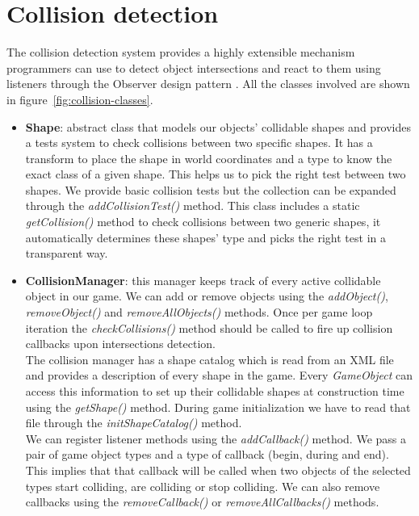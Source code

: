 \section{Collision detection}

The collision detection system provides a highly extensible mechanism
programmers can use to detect object intersections and react to them
using listeners through the Observer design pattern \cite{gamm94}. All
the classes involved are shown in figure~\ref{fig:collision-classes}.


\begin{itemize}
	\item \textbf{Shape}: abstract class that models our objects' collidable shapes and provides a tests system to
	check collisions between two specific shapes. It has a transform to place the shape in world coordinates and
	a type to know the exact class of a given shape. This helps us to pick the right test between two shapes. We
	provide basic collision tests but the collection can be expanded through the \textit{addCollisionTest()} method. This
	class includes a static \textit{getCollision()} method to check collisions between two generic shapes,
	it automatically determines these shapes' type and picks the right test in a transparent way.
	
	\item \textbf{CollisionManager}: this manager keeps track of every active collidable object in our game. We can
	add or remove objects using the \textit{addObject()}, \textit{removeObject()} and \textit{removeAllObjects()} methods.
	Once per game loop iteration the \textit{checkCollisions()} method should be called to fire up collision callbacks
	upon intersections detection.\\
	
	The collision manager has a shape catalog which is read from an XML file and provides a description of every
	shape in the game. Every \textit{GameObject} can access this information to set up their collidable shapes
	at construction time using the \textit{getShape()} method. During game initialization we have to read that
	file through the \textit{initShapeCatalog()} method.\\
	
	We can register listener methods using the \textit{addCallback()} method. We pass a pair of game object types
	and a type of callback (begin, during and end). This implies that that callback will be called when two
	objects of the selected types start colliding, are colliding or stop colliding. We can also remove callbacks
	using the \textit{removeCallback()} or \textit{removeAllCallbacks()} methods.
	

\end{itemize}
